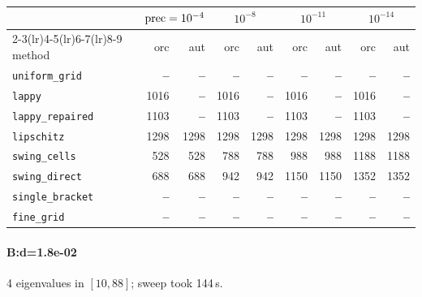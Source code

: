 \begin{center}
\small
\begin{tabular}{lrrrrrrrr}
\toprule
& \multicolumn{2}{c}{$\mathrm{prec}=10^{-4}$} & \multicolumn{2}{c}{$10^{-8}$} & \multicolumn{2}{c}{$10^{-11}$} & \multicolumn{2}{c}{$10^{-14}$} \\
\cmidrule(lr){2-3}\cmidrule(lr){4-5}\cmidrule(lr){6-7}\cmidrule(lr){8-9}
method & orc & aut & orc & aut & orc & aut & orc & aut \\
\midrule
\texttt{uniform\_grid} & \textbf{--} & \textbf{--} & \textbf{--} & \textbf{--} & \textbf{--} & \textbf{--} & \textbf{--} & \textbf{--} \\
\texttt{lappy} & 1016 & \textbf{--} & 1016 & \textbf{--} & 1016 & \textbf{--} & 1016 & \textbf{--} \\
\texttt{lappy\_repaired} & 1103 & \textbf{--} & 1103 & \textbf{--} & 1103 & \textbf{--} & 1103 & \textbf{--} \\
\texttt{lipschitz} & 1298 & 1298 & 1298 & 1298 & 1298 & 1298 & 1298 & 1298 \\
\texttt{swing\_cells} & 528 & 528 & 788 & 788 & 988 & 988 & 1188 & 1188 \\
\texttt{swing\_direct} & 688 & 688 & 942 & 942 & 1150 & 1150 & 1352 & 1352 \\
\midrule
\texttt{single\_bracket} & \textbf{--} & \textbf{--} & \textbf{--} & \textbf{--} & \textbf{--} & \textbf{--} & \textbf{--} & \textbf{--} \\
\texttt{fine\_grid} & \textbf{--} & \textbf{--} & \textbf{--} & \textbf{--} & \textbf{--} & \textbf{--} & \textbf{--} & \textbf{--} \\
\bottomrule
\end{tabular}
\end{center}

\paragraph{B:d=1.8e-02} 4 eigenvalues in $[10, 88]$; sweep took 144\,s.

